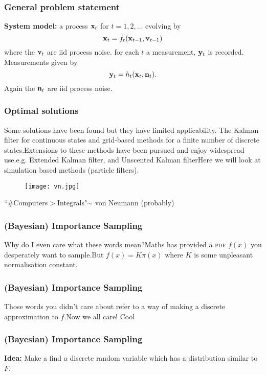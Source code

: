 \documentclass{beamer}
\begin{document}
\frame
{
\frametitle{General problem statement}
{\bf System model:} a process ${\bf x}_t$ for $t=1,2,\dots$ evolving by 
\begin{equation*}
{\bf x}_t = f_t({\bf x}_{t-1},{\bf v}_{t-1})  
\end{equation*}
where the ${\bf v}_t$ are iid process noise.\newline{} for each $t$ a measurement, ${\bf y}_t$ is recorded. Measurements given by
\begin{equation}
{\bf y}_t = h_t({\bf x}_t ,{\bf n}_t).  
\end{equation}
Again the ${\bf n}_t$ are iid process noise. 
}

\frame
{
\frametitle{Optimal solutions}
Some solutions have been found but they have limited applicability. The Kalman filter for continuous states and grid-based methods for a finite number of discrete states.\newline\newline Extensions to these methods have been pursued and enjoy widespread use.\newline\newline e.g. Extended Kalman filter, and Unscented Kalman filter\newline\newline Here we will look at simulation based methods (particle filters).
}

\frame
{
\begin{figure}[htb]
\texttt{[image: vn.jpg]}
\end{figure}
``\#Computers$>$Integrals"$\sim$ von Neumann (probably)
}

\frame
{
\frametitle{(Bayesian) Importance Sampling}
Why do I even care what these words mean?\newline\newline Maths has provided a \textsc{pdf} $f(x)$ you desperately want to sample.\newline\newline But $f(x) = K\pi(x)$ where $K$ is some unpleasant normalisation constant.
}

\frame
{
\frametitle{(Bayesian) Importance Sampling}
Those words you didn't care about refer to a way of making a discrete approximation to $f$.\newline\newline Now we all care! Cool
}

\frame
{
\frametitle{(Bayesian) Importance Sampling}
\textbf{Idea:} Make a find a discrete random variable which has a distribution similar to $F$.
}
\end{document}
